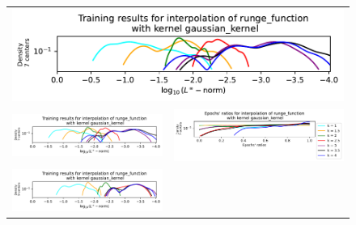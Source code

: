 \documentclass[12pt]{report} %
\begin{document}
\begin{figure}[H]
  \hspace*{-2.8cm}
  \begin{tabular}{rl}
    \multicolumn{2}{c}{{\includegraphics[width=.7\textwidth, trim={0 3.1cm 0 0},clip=true]
    {imagenes/experiments/1d/statistical_1d_full/runge_function/linf_runge_function_C7_gaussian_kernel.pdf}}}                                                                                       \\
    {\includegraphics[width=.68\textwidth, trim={.58cm 1.25cm 0 1.17cm},clip=true]
    {imagenes/experiments/1d/statistical_1d_full/runge_function/linf_runge_function_C7_gaussian_kernel.pdf}}  & {\includegraphics[width=.62\textwidth, trim={1cm 2.4cm 2.88cm 1.17cm},clip=true]
    {imagenes/experiments/1d/statistical_1d_full/runge_function/epochs_runge_function_C7_gaussian_kernel.pdf}}                                                                                      \\
    {\includegraphics[width=.68\textwidth, trim={.58cm 1.25cm 0 1.17cm},clip=true]
    {imagenes/experiments/1d/statistical_1d_full/runge_function/linf_runge_function_C9_gaussian_kernel.pdf}}  & {\includegraphics[width=.62\textwidth, trim={1cm 2.4cm 2.88cm 1.17cm},clip=true]
}
\end{tabular}
\end{figure}
\end{document}
